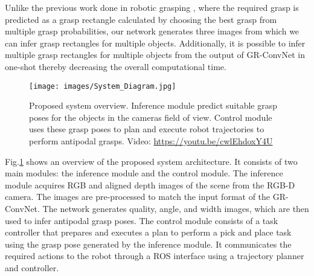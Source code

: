 \documentclass[letterpaper, 10 pt, conference]{ieeeconf}
\begin{document}
Unlike the previous work done in robotic grasping \cite{lenz2015deep,redmon2015real,pinto2016supersizing,kumra2017robotic}, where the required grasp is predicted as a grasp rectangle calculated by choosing the best grasp from multiple grasp probabilities, our network generates three images from which we can infer grasp rectangles for multiple objects. Additionally, it is possible to infer multiple grasp rectangles for multiple objects from the output of GR-ConvNet in one-shot thereby decreasing the overall computational time.

\begin{figure}
    \centering
    \texttt{[image: images/System\_Diagram.jpg]}
    \caption{Proposed system overview. Inference module predict suitable grasp poses for the objects in the camera\textquotesingle s field of view. Control module uses these grasp poses to plan and execute robot trajectories to perform antipodal grasps. Video: \href{https://youtu.be/cwlEhdoxY4U}{https://youtu.be/cwlEhdoxY4U}}
    \label{fig: architecture}
\end{figure}

Fig.\ref{fig: architecture} shows an overview of the proposed system architecture. It consists of two main modules: the inference module and the control module. The inference module acquires RGB and aligned depth images of the scene from the RGB-D camera. The images are pre-processed to match the input format of the GR-ConvNet. The network generates quality, angle, and width images, which are then used to infer antipodal grasp poses. The control module consists of a task controller that prepares and executes a plan to perform a pick and place task using the grasp pose generated by the inference module. It communicates the required actions to the robot through a ROS interface using a trajectory planner and controller.
\end{document}
